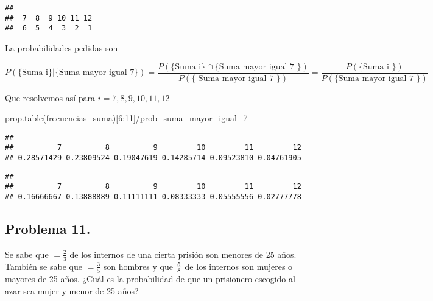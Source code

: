 \documentclass[
]{article}
\newenvironment{Shaded}{\begin{snugshade}}{\end{snugshade}}
\newcommand{\DecValTok}[1]{\textcolor[rgb]{0.00,0.00,0.81}{#1}}
\newcommand{\FunctionTok}[1]{\textcolor[rgb]{0.00,0.00,0.00}{#1}}
\newcommand{\NormalTok}[1]{#1}
\newcommand{\SpecialCharTok}[1]{\textcolor[rgb]{0.00,0.00,0.00}{#1}}
\begin{document}
\begin{verbatim}
## 
##  7  8  9 10 11 12 
##  6  5  4  3  2  1
\end{verbatim}

La probabilidades pedidas son

\[P(\{\mbox{Suma  i}\}|\{\mbox{Suma\ mayor igual 7\}})
=\frac{P(\mbox{\{Suma\ i\}}\cap 
\{\mbox{Suma mayor igual 7 \}})}{P(\{\mbox{ Suma mayor igual 7 \}})} =\frac{P(\{ \mbox{Suma i \}})}{P(\{\mbox{Suma mayor igual 7 \}})}
\]

Que resolvemos así para \(i=7,8,9,10,11,12\)

\begin{Shaded}
\begin{Highlighting}[]
\FunctionTok{prop.table}\NormalTok{(frecuencias\_suma)[}\DecValTok{6}\SpecialCharTok{:}\DecValTok{11}\NormalTok{]}\SpecialCharTok{/}\NormalTok{prob\_suma\_mayor\_igual\_7}
\end{Highlighting}
\end{Shaded}

\begin{verbatim}
## 
##          7          8          9         10         11         12 
## 0.28571429 0.23809524 0.19047619 0.14285714 0.09523810 0.04761905
\end{verbatim}

\begin{Shaded}
\end{Shaded}

\begin{verbatim}
## 
##          7          8          9         10         11         12 
## 0.16666667 0.13888889 0.11111111 0.08333333 0.05555556 0.02777778
\end{verbatim}

\hypertarget{problema-11.}{%
\subsection{Problema 11.}\label{problema-11.}}

Se sabe que \(=\frac23\) de los internos de una cierta prisión son
menores de 25 años. También se sabe que \(=\frac35\) son hombres y que
\({5\over 8}\) de los internos son mujeres o mayores de 25 años. ¿Cuál
es la probabilidad de que un prisionero escogido al azar sea mujer y
menor de 25 años?
\end{document}
